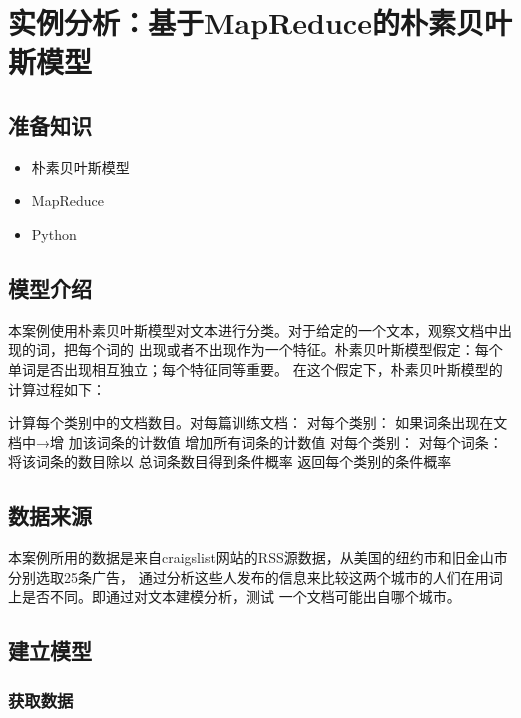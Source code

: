 \section{实例分析：基于MapReduce的朴素贝叶斯模型}\label{ux5b9eux4f8bux5206ux6790ux57faux4e8emapreduceux7684ux6734ux7d20ux8d1dux53f6ux65afux6a21ux578b}

\subsection{准备知识}\label{ux51c6ux5907ux77e5ux8bc6}

\begin{itemize}
\itemsep1pt\parskip0pt
\item
  朴素贝叶斯模型
\item
  MapReduce
\item
  Python
\end{itemize}

\subsection{模型介绍}\label{ux6a21ux578bux4ecbux7ecd}

本案例使用朴素贝叶斯模型对文本进行分类。对于给定的一个文本，观察文档中出现的词，把每个词的
出现或者不出现作为一个特征。朴素贝叶斯模型假定：每个单词是否出现相互独立；每个特征同等重要。
在这个假定下，朴素贝叶斯模型的计算过程如下：

计算每个类别中的文档数目。对每篇训练文档： 对每个类别：
如果词条出现在文档中→增 加该词条的计数值 增加所有词条的计数值
对每个类别： 对每个词条： 将该词条的数目除以 总词条数目得到条件概率
返回每个类别的条件概率

\subsection{数据来源}\label{ux6570ux636eux6765ux6e90}

本案例所用的数据是来自craigslist网站的RSS源数据，从美国的纽约市和旧金山市分别选取25条广告，
通过分析这些人发布的信息来比较这两个城市的人们在用词上是否不同。即通过对文本建模分析，测试
一个文档可能出自哪个城市。

\subsection{建立模型}\label{ux5efaux7acbux6a21ux578b}

\subsubsection{获取数据}\label{ux83b7ux53d6ux6570ux636e}

